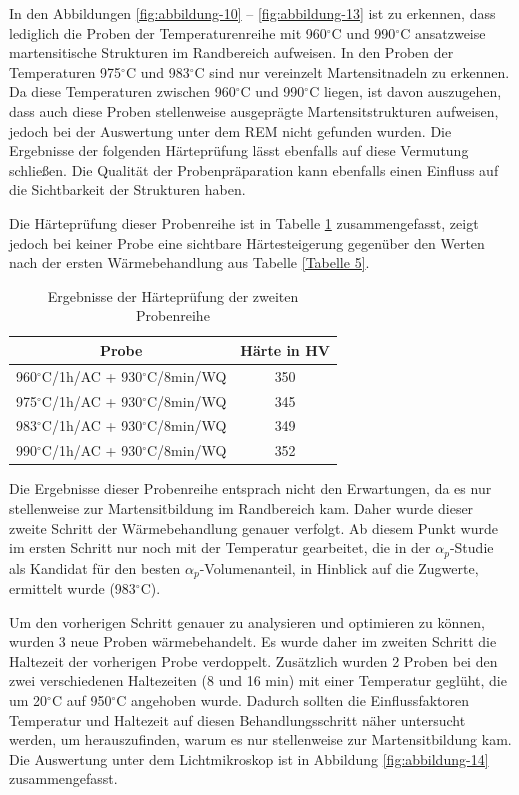 In den Abbildungen \ref{fig:abbildung-10} -- \ref{fig:abbildung-13} ist zu erkennen, dass lediglich die Proben der Temperaturenreihe mit 960$^\circ$C und 990$^\circ$C ansatzweise martensitische Strukturen im Randbereich aufweisen. In den Proben der Temperaturen 975$^\circ$C und 983$^\circ$C sind nur vereinzelt Martensitnadeln zu erkennen. Da diese Temperaturen zwischen 960$^\circ$C und 990$^\circ$C liegen, ist davon auszugehen, dass auch diese Proben stellenweise ausgeprägte Martensitstrukturen aufweisen, jedoch bei der Auswertung unter dem REM nicht gefunden wurden. Die Ergebnisse der folgenden Härteprüfung lässt ebenfalls auf diese Vermutung schließen. Die Qualität der Probenpräparation kann ebenfalls einen Einfluss auf die Sichtbarkeit der Strukturen haben.

Die Härteprüfung dieser Probenreihe ist in Tabelle \ref{Tabelle 6} zusammengefasst, zeigt jedoch bei keiner Probe eine sichtbare Härtesteigerung gegenüber den Werten nach der ersten Wärmebehandlung aus Tabelle \ref{Tabelle 5}.

\begin{table}
	\centering
	\begin{tabular}{|c|c|}
		\hline 
		Probe & Härte in HV \\ 
		\hline 
		960$^\circ$C/1h/AC + 930$^\circ$C/8min/WQ & 350 \\ 
		\hline 
		975$^\circ$C/1h/AC + 930$^\circ$C/8min/WQ & 345 \\ 
		\hline 
		983$^\circ$C/1h/AC + 930$^\circ$C/8min/WQ & 349 \\ 
		\hline 
		990$^\circ$C/1h/AC + 930$^\circ$C/8min/WQ & 352 \\ 
		\hline 
	\end{tabular} 
	\caption{Ergebnisse der Härteprüfung der zweiten Probenreihe}
	\label{Tabelle 6}
\end{table}

Die Ergebnisse dieser Probenreihe entsprach nicht den Erwartungen, da es nur stellenweise zur Martensitbildung im Randbereich kam. Daher wurde dieser zweite Schritt der Wärmebehandlung genauer verfolgt. Ab diesem Punkt wurde im ersten Schritt nur noch mit der Temperatur gearbeitet, die in der $\alpha_p$-Studie als Kandidat für den besten $\alpha_p$-Volumenanteil, in Hinblick auf die Zugwerte, ermittelt wurde (983$^\circ$C). 

Um den vorherigen Schritt genauer zu analysieren und optimieren zu können, wurden 3 neue Proben wärmebehandelt. Es wurde daher im zweiten Schritt die Haltezeit der vorherigen Probe verdoppelt. Zusätzlich wurden 2 Proben bei den zwei verschiedenen Haltezeiten (8 und 16 min) mit einer Temperatur geglüht, die um 20$^\circ$C auf 950$^\circ$C angehoben wurde. Dadurch sollten die Einflussfaktoren Temperatur und Haltezeit auf diesen Behandlungsschritt näher untersucht werden, um herauszufinden, warum es nur stellenweise zur Martensitbildung kam. Die Auswertung unter dem Lichtmikroskop ist in Abbildung \ref{fig:abbildung-14} zusammengefasst. 

